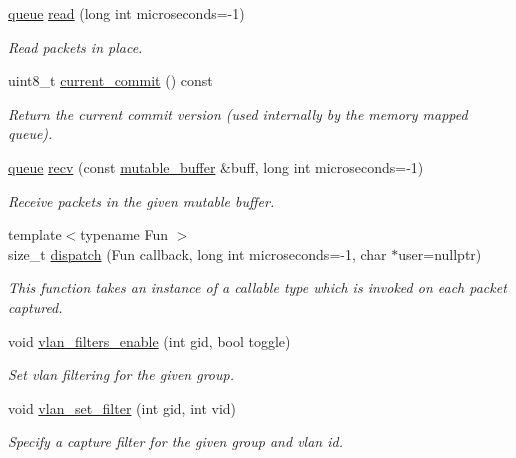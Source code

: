 \begin{DoxyCompactItemize}
\hyperlink{classnet_1_1queue}{queue} \hyperlink{classnet_1_1pfq_aa5f1f823256285ebd45d47e454ce7bd4}{read} (long int microseconds=-\/1)
\begin{DoxyCompactList}\small\item\em Read packets in place. \end{DoxyCompactList}\item 
uint8\-\_\-t \hyperlink{classnet_1_1pfq_a31aa0b2b6221c4b70ade77ad00e2761b}{current\-\_\-commit} () const 
\begin{DoxyCompactList}\small\item\em Return the current commit version (used internally by the memory mapped queue). \end{DoxyCompactList}\item 
\hyperlink{classnet_1_1queue}{queue} \hyperlink{classnet_1_1pfq_a858804361efdbd149b838940319be49c}{recv} (const \hyperlink{namespacenet_ac0df3fa0efbc044d8a2441906e8f61cb}{mutable\-\_\-buffer} \&buff, long int microseconds=-\/1)
\begin{DoxyCompactList}\small\item\em Receive packets in the given mutable buffer. \end{DoxyCompactList}\item 
{\footnotesize template$<$typename Fun $>$ }\\size\-\_\-t \hyperlink{classnet_1_1pfq_af96974c25658386b3ad994b0de43f4b2}{dispatch} (Fun callback, long int microseconds=-\/1, char $\ast$user=nullptr)
\begin{DoxyCompactList}\small\item\em This function takes an instance of a callable type which is invoked on each packet captured. \end{DoxyCompactList}\item 
void \hyperlink{classnet_1_1pfq_ae70dad67b0f243e604ffc6d94a888454}{vlan\-\_\-filters\-\_\-enable} (int gid, bool toggle)
\begin{DoxyCompactList}\small\item\em Set vlan filtering for the given group. \end{DoxyCompactList}\item 
void \hyperlink{classnet_1_1pfq_ae659846711122122b7a086f70e4b2375}{vlan\-\_\-set\-\_\-filter} (int gid, int vid)
\begin{DoxyCompactList}\small\item\em Specify a capture filter for the given group and vlan id. \end{DoxyCompactList}\item 

\end{DoxyCompactItemize}
